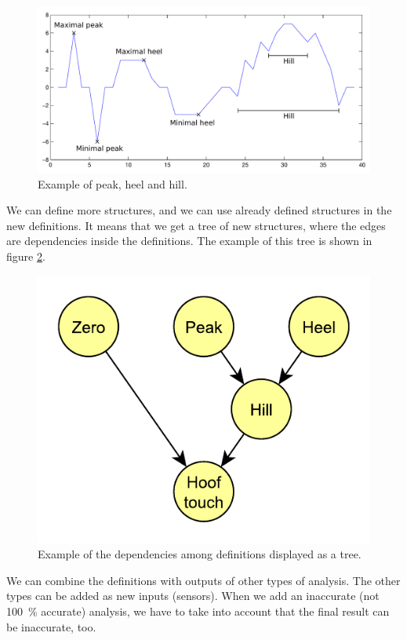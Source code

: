 \begin{figure}
    \centering
    \label{fig:peakHeelHill}
    \caption{Example of peak, heel and hill.}
    \includegraphics[width=\linewidth]{img/peakHeelHillExample.pdf}
\end{figure}

We can define more structures, and we can use already defined structures in the new definitions. It means that we get a tree of new structures, where the edges are dependencies inside the definitions. The example of this tree is shown in figure \ref{fig:definitionTree}.

\begin{figure}
    \centering
    \label{fig:definitionTree}
    \caption{Example of the dependencies among definitions displayed as a tree.}
    \includegraphics[scale=1]{img/definitionTree.pdf}
\end{figure}

We can combine the definitions with outputs of other types of analysis. The other types can be added as new inputs (sensors). When we add an inaccurate (not \SI{100}{\%} accurate) analysis, we have to take into account that the final result can be inaccurate, too.

